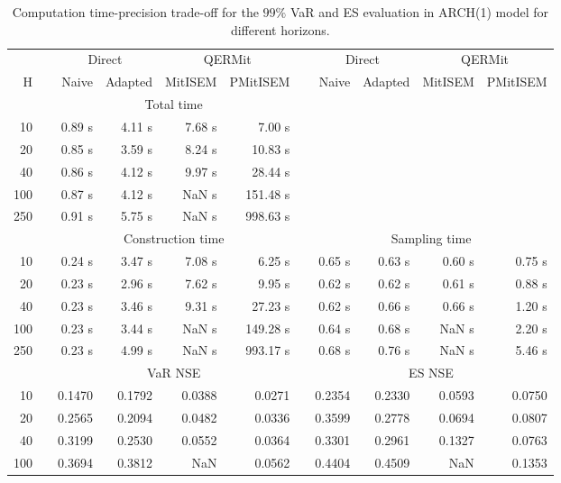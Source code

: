 \footnotesize{  
{ \renewcommand{\arraystretch}{1.3} 
\begin{longtable}{rr rrrr r rrrr}  
\caption{Computation time-precision trade-off for the  $99\%$ VaR and ES evaluation in ARCH(1) model for different horizons.} 
\label{tab:time_precision_arch} \\ 
 & & \multicolumn{2}{c}{Direct} & \multicolumn{2}{c}{QERMit}&  & \multicolumn{2}{c}{Direct} & \multicolumn{2}{c}{QERMit} \\ \cline{3-6} \cline{8-11} 
 H & & Naive & Adapted & MitISEM & PMitISEM & & Naive & Adapted & MitISEM & PMitISEM \\ \hline 
 & & \multicolumn{4}{c}{Total time}  \\ \cline{3-6} 
10 & & 0.89 s & 4.11 s & 7.68 s & 7.00 s \\ 
20 & & 0.85 s & 3.59 s & 8.24 s & 10.83 s \\ 
40 & & 0.86 s & 4.12 s & 9.97 s & 28.44 s \\ 
100 & & 0.87 s & 4.12 s &  NaN s & 151.48 s \\ 
250 & & 0.91 s & 5.75 s &  NaN s & 998.63 s \\ 
\hline 
 & & \multicolumn{4}{c}{Construction time} & & \multicolumn{4}{c}{ Sampling time} \\ \cline{3-6}  \cline{8-11}
10 & & 0.24 s & 3.47 s & 7.08 s & 6.25 s && 0.65 s & 0.63 s & 0.60 s & 0.75 s \\ 
20 & & 0.23 s & 2.96 s & 7.62 s & 9.95 s && 0.62 s & 0.62 s & 0.61 s & 0.88 s \\ 
40 & & 0.23 s & 3.46 s & 9.31 s & 27.23 s && 0.62 s & 0.66 s & 0.66 s & 1.20 s \\ 
100 & & 0.23 s & 3.44 s &  NaN s & 149.28 s && 0.64 s & 0.68 s &  NaN s & 2.20 s \\ 
250 & & 0.23 s & 4.99 s &  NaN s & 993.17 s && 0.68 s & 0.76 s &  NaN s & 5.46 s \\ 
\hline 
 & & \multicolumn{4}{c}{VaR NSE} &&  \multicolumn{4}{c}{ES NSE} \\ \cline{3-6}  \cline{8-11}
10 && 0.1470  & 0.1792  & 0.0388 & 0.0271 && 0.2354  & 0.2330  & 0.0593 & 0.0750 \\ 
20 && 0.2565  & 0.2094  & 0.0482 & 0.0336 && 0.3599  & 0.2778  & 0.0694 & 0.0807 \\ 
40 && 0.3199  & 0.2530  & 0.0552 & 0.0364 && 0.3301  & 0.2961  & 0.1327 & 0.0763 \\ 
100 && 0.3694  & 0.3812  &    NaN & 0.0562 && 0.4404  & 0.4509  &    NaN & 0.1353 \\ 

\end{longtable}}}
